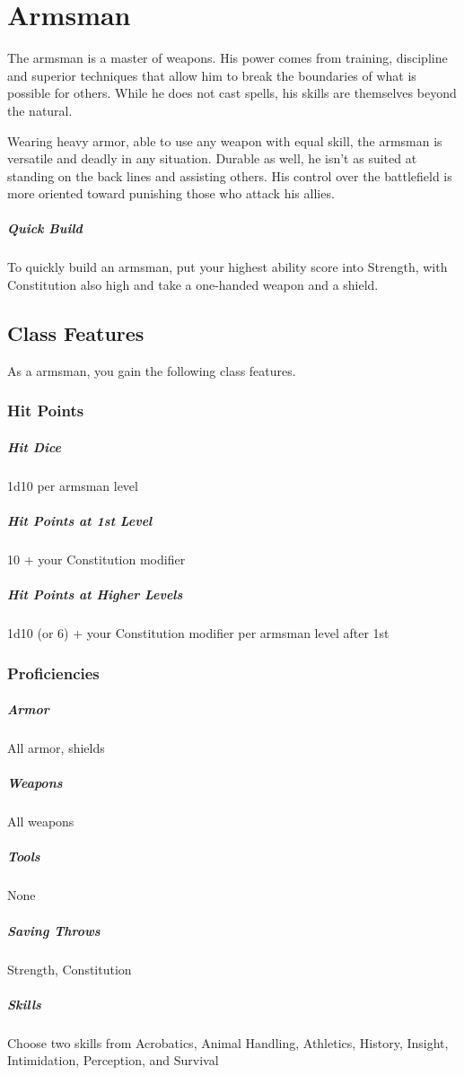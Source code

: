 \section{Armsman\label{class:armsman}}

The armsman is a master of weapons. His power comes from training, discipline and superior techniques that allow him to break the boundaries of what is possible for others. While he does not cast spells, his skills are themselves beyond the natural.

Wearing heavy armor, able to use any weapon with equal skill, the armsman is versatile and deadly in any situation. Durable as well, he isn't as suited at standing on the back lines and assisting others. His control over the battlefield is more oriented toward punishing those who attack his allies.

\subparagraph*{Quick Build}
To quickly build an armsman, put your highest ability score into Strength, with Constitution also high and take a one-handed weapon and a shield.

\subsection{Class Features}

As a armsman, you gain the following class features.

\subsubsection{Hit Points}

\subparagraph*{Hit Dice} 1d10 per armsman level

\subparagraph*{Hit Points at 1st Level} 10 + your Constitution modifier

\subparagraph*{Hit Points at Higher Levels} 1d10 (or 6) + your Constitution modifier per armsman level after 1st

\subsubsection{Proficiencies}

\subparagraph*{Armor} All armor, shields

\subparagraph*{Weapons} All weapons

\subparagraph*{Tools} None

\subparagraph*{Saving Throws} Strength, Constitution

\subparagraph*{Skills} Choose two skills from Acrobatics, Animal Handling, Athletics, History, Insight, Intimidation, Perception, and Survival

